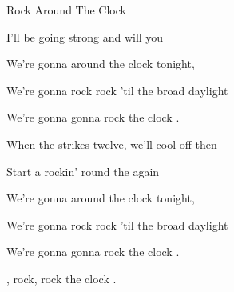 \begin{SBSong}{Rock Around The Clock}
\begin{SBVerse}
    I'll be going strong and  will you
    
    We're gonna  around the clock tonight,
    
    We're gonna  rock rock 'til the broad daylight
    
    We're gonna  gonna rock  the clock .

  \end{SBVerse} 
  \begin{SBVerse}  
    When the  strikes twelve, we'll cool off then
    
    Start a rockin' round the  again
    
    We're gonna  around the clock tonight,
    
    We're gonna  rock rock 'til the broad daylight
    
    We're gonna  gonna rock  the clock .
    
    , rock, rock  the clock . 
  \end{SBVerse}
\end{SBSong}
